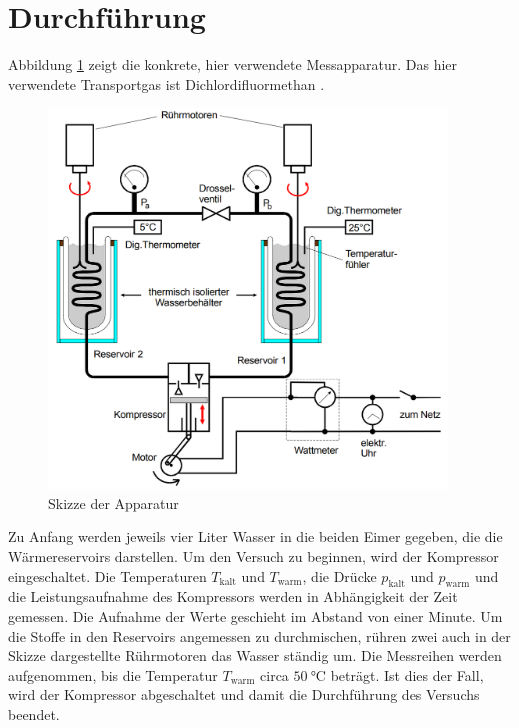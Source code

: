 \section{Durchführung}
\label{sec:Durchführung}
Abbildung \ref{fig:waermepumpebildkonkret} zeigt die konkrete, hier verwendete
Messapparatur. Das hier verwendete Transportgas ist Dichlordifluormethan
.
\begin{figure}
  \centering
  \includegraphics[width=300pt]{data/waermepumpekonkret.png}
  \caption{Skizze der Apparatur \cite{Versuchsanleitung}}
  \label{fig:waermepumpebildkonkret}
\end{figure}
Zu Anfang werden jeweils vier Liter Wasser in die beiden Eimer gegeben, die die
Wärmereservoirs darstellen. Um den Versuch zu beginnen, wird der Kompressor eingeschaltet.
Die Temperaturen $T_\text{kalt}$ und $T_\text{warm}$, die Drücke $p_\text{kalt}$
und $p_\text{warm}$ und die Leistungsaufnahme des Kompressors werden in Abhängigkeit der
Zeit gemessen. Die Aufnahme der Werte geschieht im Abstand von einer Minute. Um die
Stoffe in den Reservoirs angemessen zu durchmischen, rühren zwei auch in der Skizze dargestellte
Rührmotoren das Wasser ständig um. Die Messreihen werden aufgenommen, bis die Temperatur
$T_\text{warm}$ circa $\SI{50}{\celsius}$ beträgt. Ist dies der Fall, wird der Kompressor
abgeschaltet und damit die Durchführung des Versuchs beendet.
